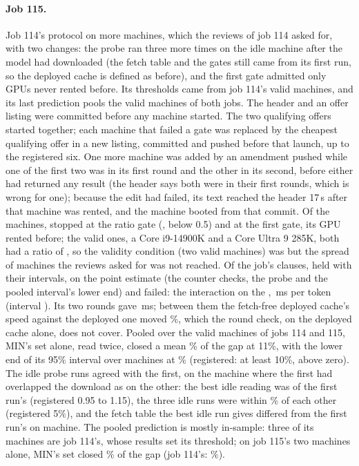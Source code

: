\paragraph{Job 115.} Job 114's protocol on more machines, which the reviews of job 114 asked for, with two changes: the
probe ran three more times on the idle machine after the model had downloaded (the fetch table and the gates still came
from its first run, so the deployed cache is defined as before), and the first gate admitted only GPUs never rented
before. Its thresholds came from job 114's valid machines, and its last prediction pools the valid machines of both
jobs. The header and an offer listing were committed before any machine started. The two qualifying offers started
together; each machine that failed a gate was replaced by the cheapest qualifying offer in a new listing, committed and
pushed before that launch, up to the registered six. One more machine was added by an amendment pushed while one of the
first two was in its first round and the other in its second, before either had returned any result (the header says
both were in their first rounds, which is wrong for one); because the edit had failed, its text reached the header 17\,s
after that machine was rented, and the machine booted from that commit. Of the \dqStartedWord{} machines, \dqVRFailN{} stopped at the ratio
gate (\dqVRFailList, below 0.5) and \dqVZeroFailN{} at the first gate, its GPU rented before;
the \dqNWord{} valid ones, a Core i9-14900K and a Core Ultra 9 285K, both had a ratio of \dqRatioRng, so the validity
condition (two valid machines) was \dqValidStatus{} but the spread of machines the reviews asked for was not reached. Of
the job's \dqClauses{} clauses, \dqClausesHeld{} held with their intervals, \dqClausesPoint{} on the point estimate
(the counter checks, the probe and the pooled interval's lower end) and \dqClausesFailed{} failed: the interaction on the
\dqInterNegCpu, \dqInterNegMsRng\,ms per token (interval \dqInterNegCI). Its two rounds gave \dqInterNegRounds\,ms;
between them the fetch-free deployed cache's speed against the deployed one moved \dqInterNegBaseZeroMove\%, which the
round check, on the deployed cache alone, does not cover. Pooled over the \dqHEightN{} valid machines of jobs 114 and
115, MIN's set alone, read twice, closed a mean \dqHEightMean\% of the gap at 11\%, with the lower end of its 95\%
interval over machines at \dqHEightLo\% (registered: at least 10\%, above zero). The idle probe runs agreed with the
first, on the machine where the first had overlapped the download as on the other: the best idle reading was
\dqProbeIdleRatioRng{} of the first run's (registered 0.95 to 1.15), the three idle runs were within
\dqProbeIdleSpreadPctMax\% of each other (registered 5\%), and the fetch table the best idle run gives differed from the
first run's on \dqProbeTableChanged{} machine. The pooled prediction is mostly in-sample: three of its \dqHEightN{}
machines are job 114's, whose results set its threshold; on job 115's two machines alone, MIN's set closed
\dqShSetaloneZeroLowRng\% of the gap (job 114's: \dzShSetaloneZeroLowRng\%).

